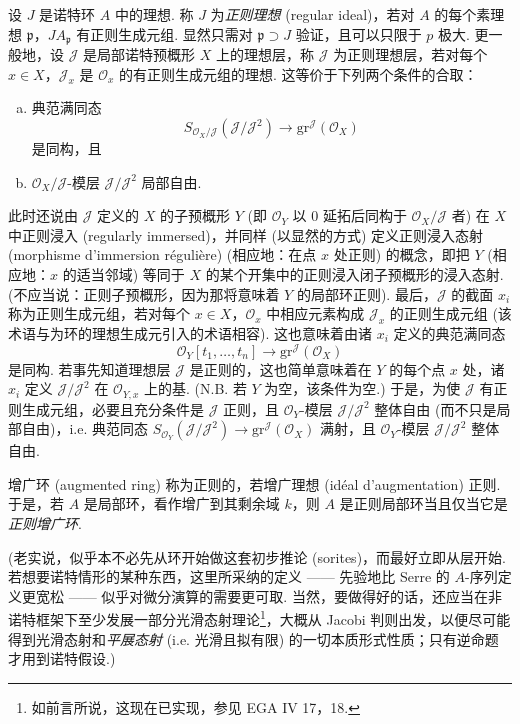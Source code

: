 设 $J$ 是诺特环 $A$ 中的理想. 称 $J$ 为\emph{正则理想} (regular ideal)，若对 $A$ 的每个素理想 $\mathfrak{p}$，$JA_{\mathfrak{p}}$ 有正则生成元组. 显然只需对 $\mathfrak{p} \supset J$ 验证，且可以只限于 $p$ 极大. 更一般地，设 $\mathcal{J}$ 是局部诺特预概形 $X$ 上的理想层，称 $\mathcal{J}$ 为正则理想层，若对每个 $x \in X$，$\mathcal{J}_x$ 是 $\mathcal{O}_x$ 的有正则生成元组的理想. 这等价于下列两个条件的合取：
\begin{enumerate}[a)]
\item 典范满同态
\[
S_{\mathcal{O}_X/\mathcal{J}}(\mathcal{J}/\mathcal{J}^2) \longrightarrow \mathrm{gr}^{\mathcal{J}}(\mathcal{O}_X)
\]
是同构，且
\item $\mathcal{O}_X/\mathcal{J}$-模层 $\mathcal{J}/\mathcal{J}^2$ 局部自由.
\end{enumerate}
此时还说由 $\mathcal{J}$ 定义的 $X$ 的子预概形 $Y$ (即 $\mathcal{O}_Y$ 以 0 延拓后同构于 $\mathcal{O}_X/\mathcal{J}$ 者) 在 $X$ 中正则浸入 (regularly immersed)，并同样 (以显然的方式) 定义正则浸入态射 (morphisme d'immersion régulière) (相应地：在点 $x$ 处正则) 的概念，即把 $Y$ (相应地：$x$ 的适当邻域) 等同于 $X$ 的某个开集中的正则浸入闭子预概形的浸入态射. (不应当说：正则子预概形，因为那将意味着 $Y$ 的局部环正则). 最后，$\mathcal{J}$ 的截面 $x_i$ 称为正则生成元组，若对每个 $x \in X$，$\mathcal{O}_x$ 中相应元素构成 $\mathcal{J}_x$ 的正则生成元组 (该术语与为环的理想生成元引入的术语相容). 这也意味着由诸 $x_i$ 定义的典范满同态
\[
\mathcal{O}_Y[t_1, \dots, t_n] \longrightarrow \mathrm{gr}^{\mathcal{J}}(\mathcal{O}_X)
\]
是同构. 若事先知道理想层 $\mathcal{J}$ 是正则的，这也简单意味着在 $Y$ 的每个点 $x$ 处，诸 $x_i$ 定义 $\mathcal{J}/\mathcal{J}^2$ 在 $\mathcal{O}_{Y,x}$ 上的基. (N.B. 若 $Y$ 为空，该条件为空.) 于是，为使 $\mathcal{J}$ 有正则生成元组，必要且充分条件是 $\mathcal{J}$ 正则，且 $\mathcal{O}_Y$-模层 $\mathcal{J}/\mathcal{J}^2$ 整体自由 (而不只是局部自由)，i.e. 典范同态 $S_{\mathcal{O}_Y}(\mathcal{J}/\mathcal{J}^2) \to \mathrm{gr}^{\mathcal{J}}(\mathcal{O}_X)$ 满射，且 $\mathcal{O}_Y$-模层 $\mathcal{J}/\mathcal{J}^2$ 整体自由.

增广环 (augmented ring) 称为正则的，若增广理想 (idéal d'augmentation) 正则. 于是，若 $A$ 是局部环，看作增广到其剩余域 $k$，则 $A$ 是正则局部环当且仅当它是\emph{正则增广环}.

(老实说，似乎本不必先从环开始做这套初步推论 (sorites)，而最好立即从层开始. 若想要诺特情形的某种东西，这里所采纳的定义 —— 先验地比 Serre 的 $A$-序列定义更宽松 —— 似乎对微分演算的需要更可取. 当然，要做得好的话，还应当在非诺特框架下至少发展一部分光滑态射理论\footnote{如前言所说，这现在已实现，参见 EGA IV 17，18.}，大概从 Jacobi 判则出发，以便尽可能得到光滑态射和\emph{平展态射} (i.e. 光滑且拟有限) 的一切本质形式性质；只有逆命题才用到诺特假设.)

